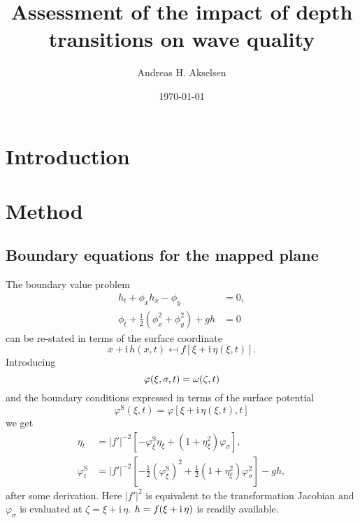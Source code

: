 \documentclass[internal]{sintefmemo}
\title{Assessment of the impact of depth transitions on wave quality}
\author{Andreas H. Akselsen}
\date{\today}
\newcommand{\mr}{\mathrm}
\renewcommand{\S}{^\mr{S}}
\newcommand{\ii}{\mr{i}\,}
\renewcommand{\_}[1]{_\mr{#1}}
\let\Re\relax
\let\Im\relax
\DeclareMathOperator\Re{Re}
\DeclareMathOperator\Im{Im}
\newcommand{\rbr}[1]{\left(#1\right)}
\newcommand{\sbr}[1]{\left[#1\right]}
\newcommand{\x}{x}
\newcommand{\zz}{\zeta}
\newcommand{\xx}{\xi}
\newcommand{\yy}{\sigma}
\newcommand{\zmap}{f}
\newcommand{\ww}{\omega}
\begin{document}
\frontmatter


\section{Introduction}




\section{Method}
\label{sec:method}
\subsection{Boundary equations for the mapped plane}
The boundary value problem 
\begin{align*}
h_t + \phi_x h_x-\phi_y&=0,\\
\phi_t + \frac12\rbr{\phi_x^2+\phi_y^2}+gh&=0
\end{align*}
can be re-stated in terms of the surface coordinate
\[
\x+\ii h(\x,t) \mapsfrom f[\xx+\ii \eta(\xx,t)].
\]
Introducing
\[\varphi(\xx,\yy,t)=\Re\ww(\zz,t) \]
and the boundary conditions expressed in terms of the surface potential 
\[
\varphi\S(\xx,t)=\varphi[\xx+\ii\eta(\xx,t),t]
\]
we get 
\begin{subequations}
\begin{align}
\eta_t &= |\zmap'|^{-2} \sbr{-   \varphi\S_\xx\eta_\xx + \rbr{1+\eta_\xx^2} \varphi_\yy},\\
\varphi\S_t  &= |\zmap'|^{-2}\sbr{ - \frac12  \rbr{\varphi\S_\xx}^2 + \frac12 \rbr{1+\eta_\xx^2} \varphi_\yy^2 }  - g h,
\end{align}%
\end{subequations}%
after some derivation.
Here $|\zmap'|^{2}$ is equivalent to the transformation Jacobian and $\varphi_\yy$ is evaluated at $\zz=\xx+\ii\eta$.
$h=\Im \zmap(\xx+\ii\eta)$ is readily available. 
\end{document}
